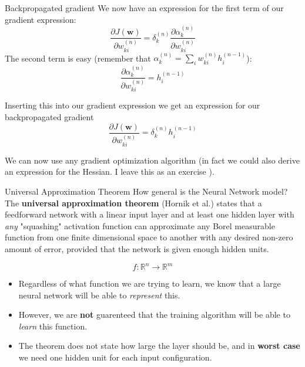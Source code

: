 \documentclass[]{beamer}
\begin{document}
\begin{frame}
   {Backpropagated gradient}
   \scriptsize
   We now have an expression for the first term of our gradient expression:
   \begin{equation*}
      \frac{\partial J\left(\boldsymbol{w} \right)}{\partial w_{ki}^{(n)}} = \delta_k^{(n)} \frac{\partial \alpha_k^{(n)} }{\partial w_{ki}^{(n)}}
   \end{equation*}
   The second term is easy (remember that $\alpha^{(n)}_k = \sum_i w_{ki}^{(n)} h^{(n-1)}_i$):
   \begin{equation*}
      \frac{\partial \alpha_k^{(n)} }{\partial w_{ki}^{(n)}} = h^{(n-1)}_i
   \end{equation*}
   
   Inserting this into our gradient expression we get an expression for our backpropagated gradient
   \begin{equation*}
      \frac{\partial J \left(\boldsymbol{w} \right)}{\partial w_{ki}^{(n)} } = \delta^{(n)}_k h^{(n-1)}_i
   \end{equation*}

   We can now use any gradient optimization algorithm (in fact we could also derive an expression for the Hessian. I leave this as an exercise \Cooley).
\end{frame}

\begin{frame}
   {Universal Approximation Theorem}
   \scriptsize
   How general is the Neural Network model? \newline \\

   The \textbf{universal approximation theorem} (Hornik et al.) states that a feedforward network with a linear input layer and at least one hidden layer with
   \emph{any} "squashing" activation function can approximate any Borel measurable function 
   from one finite dimensional space to another with any desired non-zero amount of error, 
   provided that the network is given enough hidden units.
   
   \vspace{0.2cm}
   \begin{equation*}
      f : \mathbb{R}^n \rightarrow \mathbb{R}^m
   \end{equation*}
   \vspace{0.2cm}

   \begin{itemize}
      \item
         Regardless of what function we are trying to learn, we know that a large neural network will be able to \emph{represent} this.
      \item
         However, we are \textbf{not} guarenteed that the training algorithm will be able to \emph{learn} this function.
      \item
         The theorem does not state how large the layer should be, and in \textbf{worst case} we need one hidden unit for each input configuration.
   \end{itemize}
\end{frame}
\end{document}
